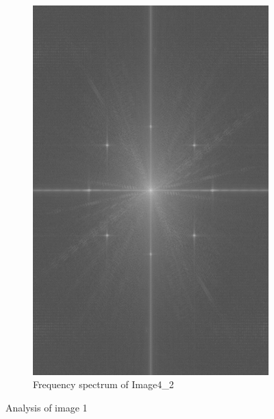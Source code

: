 \begin{figure}[H]
\begin{subfigure}[b]{0.23\textwidth}
        \label{fig:img42_src}
    \end{subfigure}
    \begin{subfigure}[b]{0.23\textwidth}
        \includegraphics[width=\textwidth]{img4/Image4_2_freq_spec.png}
        \caption{Frequency spectrum of Image4\_2}
        \label{fig:img1_hist}
    \end{subfigure}
    \caption{Analysis of image 1}\label{fig:img1}
\end{figure}

